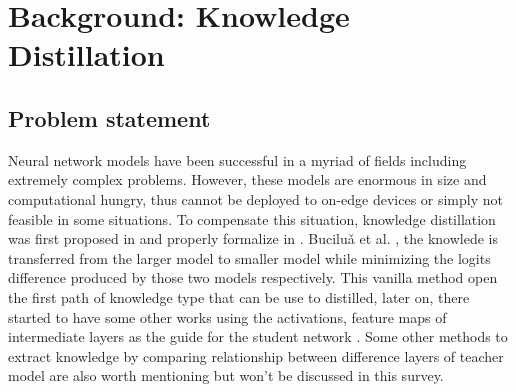 \section{Background: Knowledge Distillation}

\subsection{Problem statement}
Neural network models have been successful in a myriad of fields including extremely complex problems. However, these models are enormous in size and computational hungry, thus cannot be deployed to on-edge devices or simply not feasible in some situations. To compensate this situation, knowledge distillation was first proposed in \cite{firstkdpaper} and properly formalize in \cite{hintonfirstkd}. Buciluǎ et al. \cite{firstkdpaper}, the knowlede is transferred from the larger model to smaller model while minimizing the logits difference produced by those two models respectively. This vanilla method open the first path of knowledge type that can be use to distilled, later on, there started to have some other works using the activations, feature maps of intermediate layers as the guide for the student network \cite{featurebased01, featurebased02_AT,featurebased03_relu}. Some other methods to extract knowledge by comparing relationship between difference layers of teacher model \cite{relbase01, relbase02} are also worth mentioning but won't be discussed in this survey.


